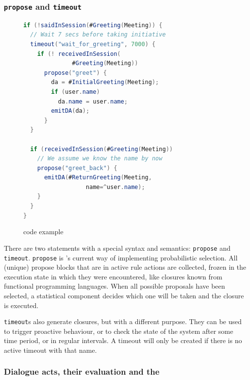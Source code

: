 \subsubsection{\texttt{propose} and \texttt{timeout}}
\begin{figure}[htbp]
  \centering\small%
\begin{lstlisting}[language=Java]
if (!saidInSession(#Greeting(Meeting)) {
  // Wait 7 secs before taking initiative
  timeout("wait_for_greeting", 7000) {
    if (! receivedInSession(
              #Greeting(Meeting))
      propose("greet") {
        da = #InitialGreeting(Meeting);
        if (user.name)
          da.name = user.name;
        emitDA(da);
      }
  }

  if (receivedInSession(#Greeting(Meeting))
    // We assume we know the name by now
    propose("greet_back") {
      emitDA(#ReturnGreeting(Meeting,
                  name=^user.name);
    }
  }
}
\end{lstlisting}\vspace*{-3ex}
  \caption{\vonda code example}
  \label{fig:propose}
\end{figure}

There are two statements with a special syntax and semantics: \texttt{propose}
and \texttt{timeout}. \texttt{propose} is \vonda's current way of implementing
probabilistic selection. All (unique) propose blocks that are in active rule
actions are collected, frozen in the execution state in which they were
encountered, like closures known from functional programming languages. When
all possible proposals have been selected, a statistical component decides
which one will be taken and the closure is executed.

\texttt{timeout}s also generate closures, but with a different purpose. They
can be used to trigger proactive behaviour, or to check the state of the system
after some time period, or in regular intervals. A timeout will only be created
if there is no active timeout with that name.

\subsubsection{Dialogue acts, their evaluation and the \caret}
\label{sec:caret}


